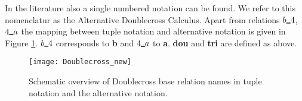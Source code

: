 In the literature also a single numbered notation can be found.
We refer to this nomenclatur as the Alternative Doublecross Calculus.
Apart from relations $b\uline 4$, $4\uline a$ the mapping between tuple notation and alternative
notation is given in Figure \ref{fig:DCC_Table_alternative}.
$b\uline 4$ corresponds to \textbf{b} and $4\uline a$ to \textbf{a}.
\textbf{dou} and \textbf{tri} are defined as above.

\begin{figure}[h!]
	\centering
	\texttt{[image: Doublecross\_new]}
	\caption{Schematic overview of Doublecross base relation names
	in tuple notation and the alternative notation.}
	\label{fig:DCC_Table_alternative}
\end{figure}


